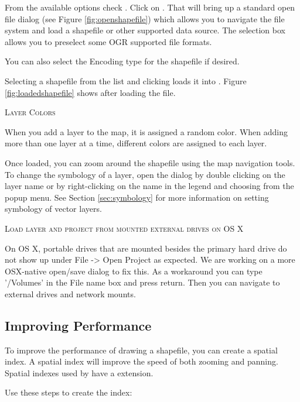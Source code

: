 From the available options check . Click on . 
That will bring up a standard open file dialog (see Figure
\ref{fig:openshapefile}) which allows you to navigate the file system and load
a shapefile or other supported data source. 
The selection box  allows you to preselect some OGR supported file formats.

You can also select the Encoding type for the shapefile if desired.

Selecting a shapefile from the list and clicking  loads it into \qg. Figure
\ref{fig:loadedshapefile} shows \qg after loading the  file.


\begin{Tip}\caption{\textsc{Layer Colors}}
When you add a layer to the map, it is assigned a random color. When
adding more than one layer at a time, different colors are assigned to each layer.
\end{Tip}

Once loaded, you can zoom around the shapefile using the map navigation tools.
To change the symbology of a layer, open the  dialog by double
clicking on the layer name or by right-clicking on the name in the legend and
choosing  from the popup menu. See
Section \ref{sec:symbology} for more information on setting symbology of
vector layers.
 
\begin{Tip}\caption{\textsc{Load layer and project from mounted external
drives on OS X}}
On OS X, portable drives that are mounted besides the primary hard
drive do not show up under File -> Open Project as expected. We are working
on a more OSX-native open/save dialog to fix this. As a workaround you can
type '/Volumes' in the File name box and press return. Then you can navigate
to external drives and network mounts.
\end{Tip}
 
\subsection{Improving Performance}

To improve the performance of drawing a shapefile, you can create a spatial
index. A  spatial index will improve the 
speed of both zooming and panning. Spatial indexes used by \qg have a 
 extension.

Use these steps to create the index:

